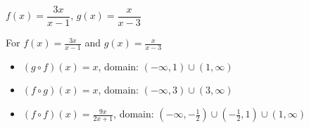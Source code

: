 {$f(x) = \dfrac{3x}{x-1}$, $g(x) =\dfrac{x}{x-3}$}
{For   $f(x) = \frac{3x}{x-1}$ and $g(x) =\frac{x}{x-3}$

\begin{itemize}

\item  $(g \circ f)(x) =x$, domain: $\left(-\infty, 1\right) \cup (1, \infty)$

\item  $(f \circ g)(x) =x$, domain:  $\left(-\infty, 3\right) \cup (3,\infty)$

\item  $(f \circ f)(x) = \frac{9x}{2x+1}$, domain: $\left(-\infty, -\frac{1}{2}\right) \cup \left(-\frac{1}{2}, 1 \right) \cup \left(1,\infty \right)$

\end{itemize}}